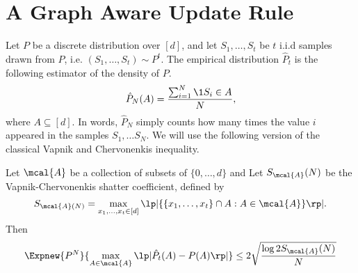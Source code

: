 \section{A Graph Aware Update Rule}\label{s:graph_aware}
Let $P$ be a discrete distribution over $[d]$, and let
$S_1, \ldots, S_t$ be $t$ i.i.d samples drawn from $P$, i.e.
$(S_1, \ldots, S_t) \sim P^t$.
The empirical distribution $\hat{P}_t$ is the following estimator of
the density of $P$.
\begin{equation}\label{eq:empirical_distribution}
  \hat{P}_N(A) = \frac{\sum_{i=1}^N \1{S_i \in A}}{N},
\end{equation}
where $A \subseteq [d]$. In words, $\hat{P}_N$ simply counts
how many times the value $i$ appeared in the samples $S_1, \ldots S_N$.
We will use the following version of the classical Vapnik and
Chervonenkis inequality.
\begin{lemma}\label{l:vc_inequality}
  Let $\mcal{A}$ be a collection of subsets of $\{0,\ldots, d\}$ and
  Let $S_{\mcal{A}}(N)$ be the Vapnik-Chervonenkis shatter coefficient, defined
  by
  \[
    S_{\mcal{A}(N)} = \max_{x_1,\ldots, x_t \in [d]}
    \lp| \{ \{x_1, \ldots, x_t\} \cap A : A \in \mcal{A} \} \rp|.
  \]
  Then
  \[
    \Expnew{P^N}{\max_{A \in \mcal{A}} \lp| \hat{P}_t(A) - P(A) \rp|}
    \leq 2 \sqrt{\frac{\log{2 S_{\mcal{A}}(N)}}{N}}
  \]
\end{lemma}

